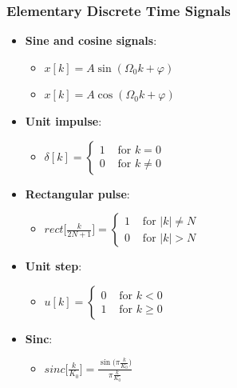 \subsubsection{Elementary Discrete Time Signals}
\begin{itemize}
    \item \textbf{Sine and cosine signals}: 
    \begin{itemize}
        \item $x[k] = A\sin(\Omega_0 k + \varphi)$
        \item $x[k] = A\cos(\Omega_0 k + \varphi)$
    \end{itemize}
    \item \textbf{Unit impulse}: 
    \begin{itemize}
        \item $\delta[k] = \left\{\begin{array}{ll} 1 & \text{ for } k=0 \\ 0 & \text{ for } k \neq 0 \end{array}\right.$
    \end{itemize}
    \item \textbf{Rectangular pulse}: 
    \begin{itemize}
        \item $rect\Big[\frac{k}{2N+1}\Big] = \left\{\begin{array}{ll} 1 & \text{ for } |k| \neq N \\ 0 & \text{ for } |k| > N \end{array}\right.$
    \end{itemize}
    \item \textbf{Unit step}: 
    \begin{itemize}
        \item $u[k] = \left\{\begin{array}{ll} 0 & \text{ for } k < 0 \\ 1 & \text{ for } k \geq 0 \end{array}\right.$
    \end{itemize}
    \item \textbf{Sinc}: 
    \begin{itemize}
        \item $sinc\Big[\frac{k}{K_0}\Big] = \frac{\sin\big(\pi\frac{k}{K_0}\big)}{\pi\frac{k}{K_0}}$
    \end{itemize}
\end{itemize}


